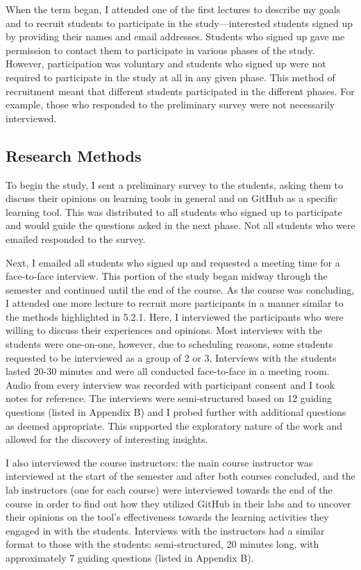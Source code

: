 When the term began, I attended one of the first lectures to describe my goals and to recruit students to participate in the study---interested students signed up by providing their names and email addresses. Students who signed up gave me permission to contact them to participate in various phases of the study. However, participation was voluntary and students who signed up were not required to participate in the study at all in any given phase. This method of recruitment meant that different students participated in the different phases. For example, those who responded to the preliminary survey were not necessarily interviewed.

\subsection{Research Methods}
To begin the study, I sent a preliminary survey to the students, asking them to discuss their opinions on learning tools in general and on GitHub as a specific learning tool. This was distributed to all students who signed up to participate and would guide the questions asked in the next phase. Not all students who were emailed responded to the survey.

Next, I emailed all students who signed up and requested a meeting time for a face-to-face interview. This portion of the study began midway through the semester and continued until the end of the course. As the course was concluding, I attended one more lecture to recruit more participants in a manner similar to the methods highlighted in 5.2.1. Here, I interviewed the participants who were willing to discuss their experiences and opinions. Most interviews with the students were one-on-one, however, due to scheduling reasons, some students requested to be interviewed as a group of 2 or 3. Interviews with the students lasted 20-30 minutes and were all conducted face-to-face in a meeting room. Audio from every interview was recorded with participant consent and I took notes for reference. The interviews were semi-structured based on 12 guiding questions (listed in Appendix B) and I probed further with additional questions as deemed appropriate. This supported the exploratory nature of the work and allowed for the discovery of interesting insights.

I also interviewed the course instructors: the main course instructor was interviewed at the start of the semester and after both courses concluded, and the lab instructors (one for each course) were interviewed towards the end of the course in order to find out how they utilized GitHub in their labs and to uncover their opinions on the tool's effectiveness towards the learning activities they engaged in with the students. Interviews with the instructors had a similar format to those with the students: semi-structured, 20 minutes long, with approximately 7 guiding questions (listed in Appendix B).

